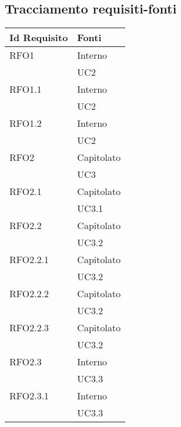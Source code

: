 \subsection{Tracciamento requisiti-fonti} 

\begin{center}
    \begin{longtable}{ | >{\centering\arraybackslash}m{5cm} | >{\centering\arraybackslash}m{5cm} | }
        
        \hline
        \textbf{Id Requisito} & \textbf{Fonti} \\ \hline
        \endhead
        
        RFO1 & Interno\\
            & UC2 \\
\hline

        RFO1.1 & Interno\\
            & UC2 \\
\hline

        RFO1.2 & Interno\\
            & UC2 \\
\hline

        RFO2 & Capitolato\\
            & UC3 \\
\hline

        RFO2.1 & Capitolato\\
            & UC3.1 \\
\hline

        RFO2.2 & Capitolato\\
            & UC3.2 \\
\hline

        RFO2.2.1 & Capitolato\\
            & UC3.2 \\
\hline

        RFO2.2.2 & Capitolato\\
            & UC3.2 \\
\hline

        RFO2.2.3 & Capitolato\\
            & UC3.2 \\
\hline

        RFO2.3 & Interno\\
            & UC3.3 \\
\hline

        RFO2.3.1 & Interno\\
            & UC3.3 \\
\hline


\end{longtable}
\end{center}
